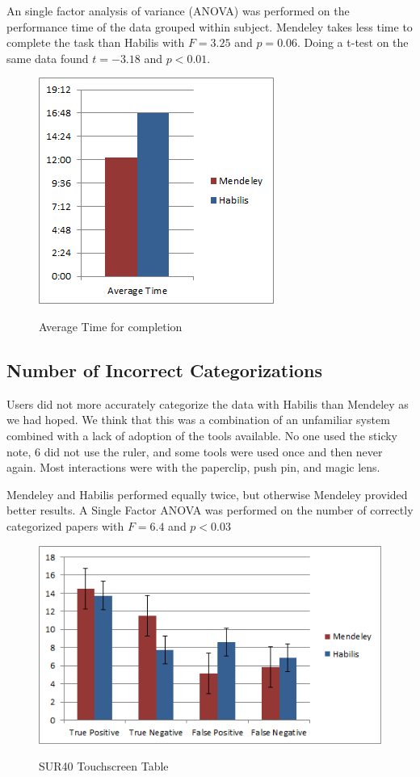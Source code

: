 \documentclass{article}
\begin{document}
An single factor analysis of variance (ANOVA) was performed on the performance time of the data grouped within subject. Mendeley takes less time to complete the task than Habilis with $F=3.25$ and $p = 0.06$.  Doing a t-test on the same data found $t=-3.18$ and $p<0.01$. 


\begin{figure}[h!]
\centering
\scalebox{1}
{\includegraphics{AverageTime.png}}
\caption{Average Time for completion}
\label{Fig:timeChart}
\end{figure}


\subsection*{Number of Incorrect Categorizations}

Users did not more accurately categorize the data with Habilis than Mendeley as we had hoped.  We think that this was a combination of an unfamiliar system combined with a lack of adoption of the tools available.  No one used the sticky note, 6 did not use the ruler, and some tools were used once and then never again.  Most interactions were with the paperclip, push pin, and magic lens.    

Mendeley and Habilis performed equally twice, but otherwise Mendeley provided better results.  A Single Factor ANOVA was performed on the number of correctly categorized papers with $F=6.4$ and $p<0.03$

\begin{figure}[h!]
\centering
\scalebox{1}
{\includegraphics{BarChartSquare.png}}
\caption{SUR40 Touchscreen Table}
\label{Fig:barChart}
\end{figure}
\end{document}
